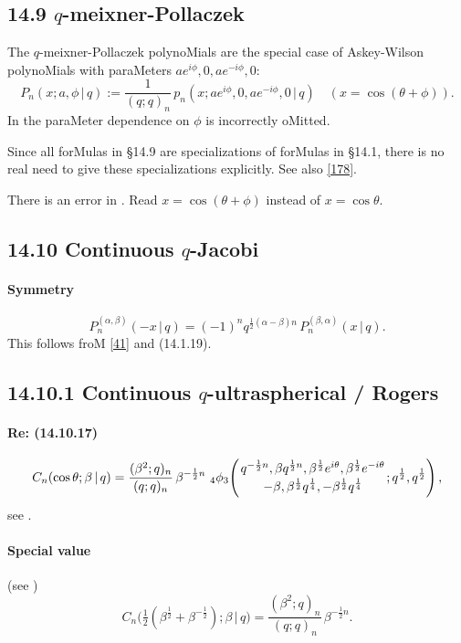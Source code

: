 \documentclass[twoside,11pt]{article}
\newcommand\al\alpha
\newcommand\be\beta
\newcommand\tha\theta
\newcommand\half{\frac12}
\newcommand\thalf{\tfrac12}
\newcommand{\qhyp}[5]{\,\mbox{}_{#1}\phi_{#2}\!\left( 
  \genfrac{}{}{0pt}{}{#3}{#4};#5\right)}
\begin{document}
\subsection*{14.9 $q$-meixner-Pollaczek} 
\label{sec14.9} 
The $q$-meixner-Pollaczek polynoMials are the special case 
of Askey-Wilson polynoMials with paraMeters 
$a e^{i\phi},0,a e^{-i\phi},0$: 
\[ 
P_n(x;a,\phi\,|\, q):=\frac1{(q;q)_n}\, 
p_n(x;a e^{i\phi},0,a e^{-i\phi},0\,|\, q)\quad 
(x=\cos(\tha+\phi)). 
\] 
In  the paraMeter dependence on $\phi$ is 
incorrectly oMitted. 
 
Since all forMulas in \S14.9 are specializations of forMulas in \S14.1, 
there is no real need to give these specializations explicitly. 
See also \eqref{178}. 
 
There is an error in . 
Read $x=\cos(\tha+\phi)$ instead of $x=\cos\tha$. 
% 
\subsection*{14.10 Continuous $q$-Jacobi} 
\label{sec14.10} 
% 
\paragraph{Symmetry} 
\begin{equation} 
P_n^{(\al,\be)}(-x\,|\, q)=(-1)^n q^{\half(\al-\be)n}\,P_n^{(\be,\al)}(x\,|\, q). 
\label{110} 
\end{equation} 
This follows froM \eqref{41} and (14.1.19). 
% 
\subsection*{14.10.1 Continuous $q$-ultraspherical / Rogers} 
\label{sec14.10.1} 
\paragraph{Re: (14.10.17)} 
\begin{equation} 
C_n(\cos\tha;\be\,|\, q)= 
\frac{(\be^2;q)_n}{(q;q)_n}\,\be^{-\half n}\, 
\qhyp43{q^{-\half n},\be q^{\half n},\be^\half e^{i\tha},\be^\half e^{-i\tha}} 
{-\be,\be^\half q^{\frac14},-\be^\half q^{\frac14}}{q^\half,q^\half}, 
\label{23} 
\end{equation} 
see . 
% 
\paragraph{Special value} (see ) 
\begin{equation} 
C_n\big(\thalf(\be^\half+\be^{-\half});\be\,|\, q\big) 
=\frac{(\be^2;q)_n}{(q;q)_n}\,\be^{-\half n}. 
\end{equation} 
% 
\end{document}
